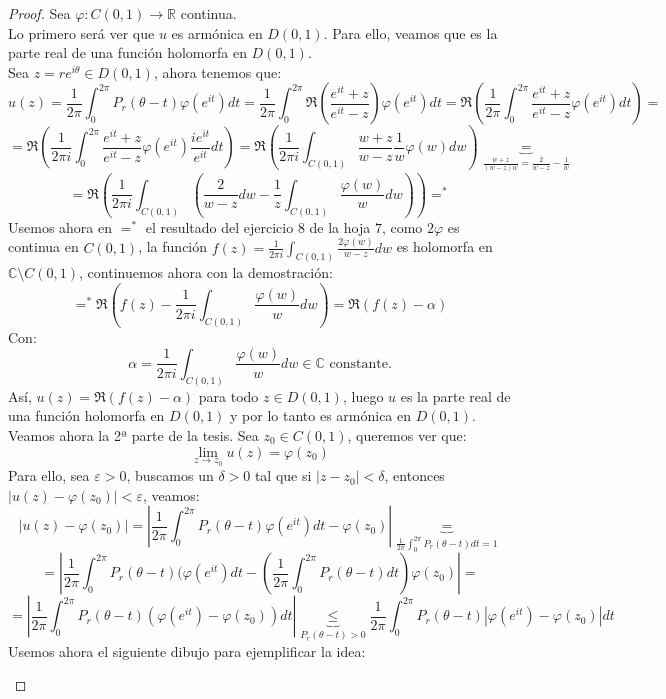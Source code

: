 \begin{proof}
    Sea $\varphi: C(0,1) \to \mathbb{R}$ continua.\\
    Lo primero será ver que $u$ es armónica en $D(0,1)$. Para ello, veamos que es la parte real de una función holomorfa en $D(0,1)$.\\
    Sea $z = re^{i\theta} \in D(0,1)$, ahora tenemos que:
    \[
        u(z) = \frac{1}{2\pi} \int_0^{2\pi} P_r(\theta - t) \varphi(e^{it}) dt = 
        \frac{1}{2\pi} \int_0^{2\pi} \Re\left( \frac{e^{it} + z}{e^{it} - z} \right) \varphi(e^{it}) dt = 
        \Re\left( \frac{1}{2\pi} \int_0^{2\pi} \frac{e^{it} + z}{e^{it} - z} \varphi(e^{it}) dt \right) =
    \]
    \[
        = \Re\left( \frac{1}{2\pi i} \int_{0}^{2\pi} \frac{e^{it} + z}{e^{it} - z} \varphi(e^{it}) \frac{ie^{it}}{e^{it}} dt \right) =
        \Re\left( \frac{1}{2\pi i} \int_{C(0,1)} \frac{w + z}{w - z} \frac{1}{w} \varphi(w) dw \right) \underbrace{=}_{\frac{w+z}{(w-z)w} = \frac{2}{w-z} - \frac{1}{w}}
    \]
    \[
        = \Re\left( \frac{1}{2\pi i} \int_{C(0,1)} \left( \frac{2}{w - z} dw
        - \frac{1}{z} \int_{C(0,1)} \frac{\varphi(w)}{w} dw \right) \right)
        =^*
    \]
    Usemos ahora en $=^*$ el resultado del ejercicio $8$ de la hoja $7$, como $2\varphi$ es continua en $C(0,1)$, la función $f(z) = \frac{1}{2\pi i} \int_{C(0,1)} \frac{2\varphi(w)}{w - z} dw$ es holomorfa en $\mathbb{C} \setminus C(0,1)$, continuemos ahora con la demostración:
    \[
        =^* \Re\left( f(z) - \frac{1}{2\pi i} \int_{C(0,1)} \frac{\varphi(w)}{w} dw \right) = \Re(f(z) - \alpha)
    \]
    Con:
    \[
        \alpha = \frac{1}{2\pi i} \int_{C(0,1)} \frac{\varphi(w)}{w} dw \in \mathbb{C} \text{ constante.}
    \]
    Así, $u(z) = \Re(f(z) - \alpha)$ para todo $z \in D(0,1)$, luego $u$ es la parte real de una función holomorfa en $D(0,1)$ y por lo tanto es armónica en $D(0,1)$.\\
    
    Veamos ahora la 2ª parte de la tesis. Sea $z_0 \in C(0,1)$, queremos ver que:
    \[
        \lim_{z \to z_0} u(z) = \varphi(z_0)
    \]
    Para ello, sea $\varepsilon > 0$, buscamos un $\delta > 0$ tal que si $|z - z_0| < \delta$, entonces $|u(z) - \varphi(z_0)| < \varepsilon$, veamos:
    \[
        |u(z) - \varphi(z_0)| = \left| \frac{1}{2\pi} \int_0^{2\pi} P_r(\theta - t) \varphi(e^{it}) dt - \varphi(z_0) \right| \underbrace{=}_{\frac{1}{2\pi} \int_0^{2\pi} P_r(\theta - t) dt = 1}
    \]
    \[
        = \left| \frac{1}{2\pi} \int_0^{2\pi} P_r(\theta - t) (\varphi(e^{it}) dt - 
        \left( \frac{1}{2\pi} \int_0^{2\pi} P_r(\theta - t) dt \right) \varphi(z_0) \right| =
    \]
    \[
        = \left| \frac{1}{2\pi} \int_0^{2\pi} P_r(\theta - t) \left( \varphi(e^{it}) - \varphi(z_0) \right) dt \right| \underbrace{\leq}_{P_r(\theta - t) > 0}
        \frac{1}{2\pi} \int_0^{2\pi} P_r(\theta - t) \left| \varphi(e^{it}) - \varphi(z_0) \right| dt
    \]
    Usemos ahora el siguiente dibujo para ejemplificar la idea:
    \begin{center}
\end{center}
\end{proof}
